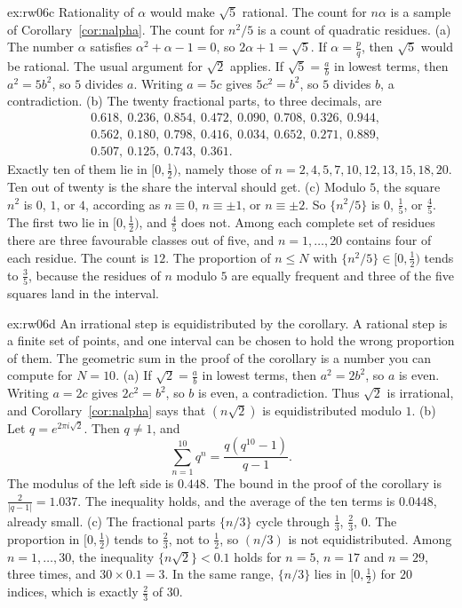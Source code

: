 \begin{solution}{ex:rw06c}
\idea Rationality of $\alpha$ would make $\sqrt5$ rational. The count for $n\alpha$ is a sample of Corollary~\ref{cor:nalpha}. The count for $n^2/5$ is a count of quadratic residues.
\writeup (a) The number $\alpha$ satisfies $\alpha^2+\alpha-1=0$, so $2\alpha+1=\sqrt5$. If $\alpha=\frac pq$, then $\sqrt5$ would be rational. The usual argument for $\sqrt2$ applies. If $\sqrt5=\frac ab$ in lowest terms, then $a^2=5b^2$, so $5$ divides $a$. Writing $a=5c$ gives $5c^2=b^2$, so $5$ divides $b$, a contradiction.
(b) The twenty fractional parts, to three decimals, are
\[
\begin{aligned}
&0.618,\ 0.236,\ 0.854,\ 0.472,\ 0.090,\ 0.708,\ 0.326,\ 0.944,\\
&0.562,\ 0.180,\ 0.798,\ 0.416,\ 0.034,\ 0.652,\ 0.271,\ 0.889,\\
&0.507,\ 0.125,\ 0.743,\ 0.361.
\end{aligned}
\]
Exactly ten of them lie in $\bigl[0,\frac12\bigr)$, namely those of $n=2,4,5,7,10,12,13,15,18,20$. Ten out of twenty is the share the interval should get.
(c) Modulo $5$, the square $n^2$ is $0$, $1$, or $4$, according as $n\equiv0$, $n\equiv\pm1$, or $n\equiv\pm2$. So $\{n^2/5\}$ is $0$, $\frac15$, or $\frac45$. The first two lie in $\bigl[0,\frac12\bigr)$, and $\frac45$ does not. Among each complete set of residues there are three favourable classes out of five, and $n=1,\ldots,20$ contains four of each residue. The count is $12$. The proportion of $n\le N$ with $\{n^2/5\}\in\bigl[0,\frac12\bigr)$ tends to $\frac35$, because the residues of $n$ modulo $5$ are equally frequent and three of the five squares land in the interval.
\end{solution}

\begin{solution}{ex:rw06d}
\idea An irrational step is equidistributed by the corollary. A rational step is a finite set of points, and one interval can be chosen to hold the wrong proportion of them. The geometric sum in the proof of the corollary is a number you can compute for $N=10$.
\writeup (a) If $\sqrt2=\frac ab$ in lowest terms, then $a^2=2b^2$, so $a$ is even. Writing $a=2c$ gives $2c^2=b^2$, so $b$ is even, a contradiction. Thus $\sqrt2$ is irrational, and Corollary~\ref{cor:nalpha} says that $(n\sqrt2)$ is equidistributed modulo $1$.
(b) Let $q=e^{2\pi i\sqrt2}$. Then $q\ne1$, and
\[
\sum_{n=1}^{10}q^n=\frac{q(q^{10}-1)}{q-1}.
\]
The modulus of the left side is $0.448$. The bound in the proof of the corollary is $\frac2{|q-1|}=1.037$. The inequality holds, and the average of the ten terms is $0.0448$, already small.
(c) The fractional parts $\{n/3\}$ cycle through $\frac13$, $\frac23$, $0$. The proportion in $\bigl[0,\frac12\bigr)$ tends to $\frac23$, not to $\frac12$, so $(n/3)$ is not equidistributed. Among $n=1,\ldots,30$, the inequality $\{n\sqrt2\}<0.1$ holds for $n=5$, $n=17$ and $n=29$, three times, and $30\times0.1=3$. In the same range, $\{n/3\}$ lies in $\bigl[0,\frac12\bigr)$ for $20$ indices, which is exactly $\frac23$ of $30$.
\end{solution}

